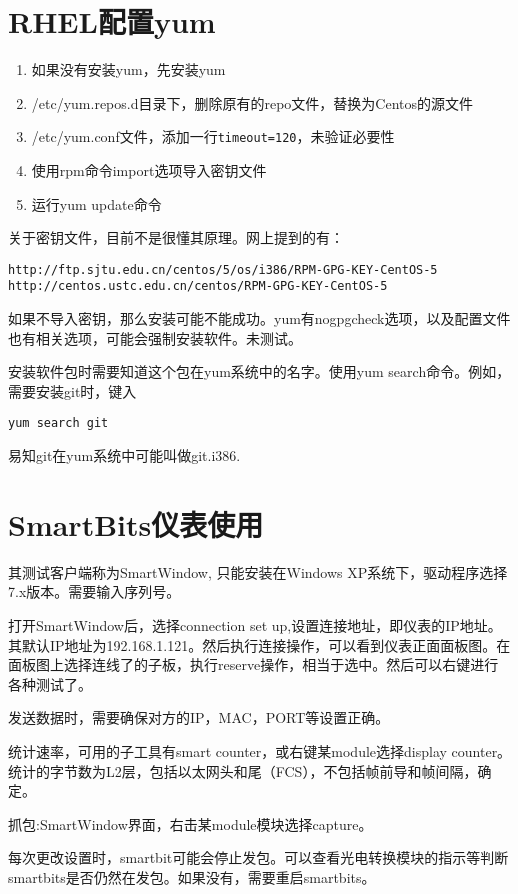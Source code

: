 \section{RHEL配置yum}

\begin{enumerate}
    \item 如果没有安装yum，先安装yum
    \item /etc/yum.repos.d目录下，删除原有的repo文件，替换为Centos的源文件
    \item /etc/yum.conf文件，添加一行\verb+timeout=120+，未验证必要性
    \item 使用rpm命令import选项导入密钥文件
    \item 运行yum update命令
\end{enumerate}

关于密钥文件，目前不是很懂其原理。网上提到的有：
\begin{verbatim}
http://ftp.sjtu.edu.cn/centos/5/os/i386/RPM-GPG-KEY-CentOS-5
http://centos.ustc.edu.cn/centos/RPM-GPG-KEY-CentOS-5
\end{verbatim}
如果不导入密钥，那么安装可能不能成功。yum有nogpgcheck选项，以及配置文件也有相关选项，可能会强制安装软件。未测试。

安装软件包时需要知道这个包在yum系统中的名字。使用yum search命令。例如，需要安装git时，键入
\begin{verbatim}
yum search git
\end{verbatim}
易知git在yum系统中可能叫做git.i386.

\section{SmartBits仪表使用}
其测试客户端称为SmartWindow, 只能安装在Windows XP系统下，驱动程序选择7.x版本。需要输入序列号。

打开SmartWindow后，选择connection set up,设置连接地址，即仪表的IP地址。其默认IP地址为192.168.1.121。然后执行连接操作，可以看到仪表正面面板图。在面板图上选择连线了的子板，执行reserve操作，相当于选中。然后可以右键进行各种测试了。

发送数据时，需要确保对方的IP，MAC，PORT等设置正确。

统计速率，可用的子工具有smart counter，或右键某module选择display counter。统计的字节数为L2层，包括以太网头和尾（FCS），不包括帧前导和帧间隔，确定。

抓包:SmartWindow界面，右击某module模块选择capture。

每次更改设置时，smartbit可能会停止发包。可以查看光电转换模块的指示等判断smartbits是否仍然在发包。如果没有，需要重启smartbits。

